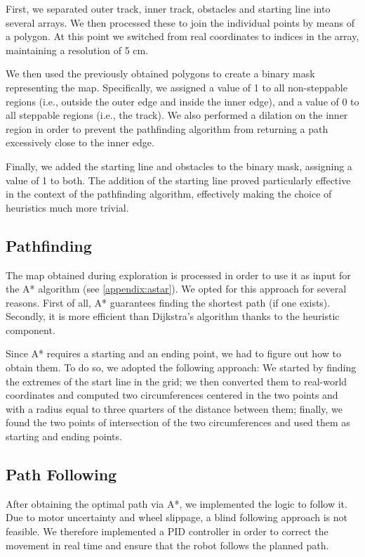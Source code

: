 \documentclass[
	12pt,
]{sty/report_style}
\newcommand{\todo}[1]{\textcolor{red}{TODO: #1}}
\begin{document}
First, we separated outer track, inner track, obstacles and starting line into several arrays. We then processed these to join the individual points by means of a polygon. At this point we switched from real coordinates to indices in the array, maintaining a resolution of 5 cm.


We then used the previously obtained polygons to create a binary mask representing the map. Specifically, we assigned a value of 1 to all non-steppable regions (i.e., outside the outer edge and inside the inner edge), and a value of 0 to all steppable regions (i.e., the track). We also performed a dilation on the inner region in order to prevent the pathfinding algorithm from returning a path excessively close to the inner edge.

Finally, we added the starting line and obstacles to the binary mask, assigning a value of 1 to both. The addition of the starting line proved particularly effective in the context of the pathfinding algorithm, effectively making the choice of heuristics much more trivial.


\subsection{Pathfinding}

The map obtained during exploration is processed in order to use it as input for the A* algorithm (see \cref{appendix:astar}). We opted for this approach for several reasons. First of all, A* guarantees finding the shortest path (if one exists). Secondly, it is more efficient than Dijkstra's algorithm thanks to the heuristic component. 

Since A* requires a starting and an ending point, we had to figure out how to obtain them. To do so, we adopted the following approach: We started by finding the extremes of the start line in the grid; we then converted them to real-world coordinates and computed two circumferences centered in the two points and with a radius equal to three quarters of the distance between them; finally, we found the two points of intersection of the two circumferences and used them as starting and ending points.

\subsection{Path Following}

After obtaining the optimal path via A*, we implemented the logic to follow it. Due to motor uncertainty and wheel slippage, a blind following approach is not feasible. We therefore implemented a PID controller in order to correct the movement in real time and ensure that the robot follows the planned path.
\end{document}
